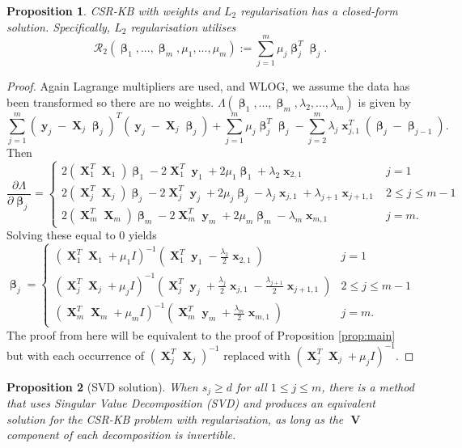 \documentclass[12pt]{article}
\DeclareMathOperator{\bx}{\mathbf{x}}
\DeclareMathOperator{\bX}{\mathbf{X}}
\DeclareMathOperator{\by}{\mathbf{y}}
\DeclareMathOperator{\bV}{\mathbf{V}}
\DeclareMathOperator{\bbeta}{\boldsymbol{\beta}}
\newtheorem{prop}{Proposition}
\begin{document}
\begin{prop}
CSR-KB with weights and $L_2$ regularisation has a closed-form solution. Specifically, $L_2$ regularisation utilises 
$$\mathcal{R}_2(\bbeta_1, ..., \bbeta_m, \mu_1, ..., \mu_m) := \sum_{j=1}^m \mu_j \bbeta_j^T\bbeta_j.$$
\end{prop}
\begin{proof}
Again Lagrange multipliers are used, and WLOG, we assume the data has been transformed so there are no weights. $\Lambda(\bbeta_1,...,\bbeta_m,\lambda_2,...,\lambda_m)$ is given by
$$\sum_{j=1}^m (\by_j-\bX_j\bbeta_j)^T(\by_j-\bX_j\bbeta_j)+\sum_{j=1}^m \mu_j \bbeta_j^T\bbeta_j-\sum_{j=2}^m\lambda_j\bx_{j, 1}^T (\bbeta_j - \bbeta_{j-1}).$$
Then
$$\frac{\partial \Lambda}{\partial \bbeta_j} = \begin{cases}
2(\bX_1^T  \bX_1)\bbeta_1 - 2\bX_1^T \by_1 + 2\mu_1\bbeta_1 +\lambda_{2}\bx_{2, 1} & j=1 \\
2(\bX_j^T  \bX_j)\bbeta_j - 2\bX_j^T  \by_j + 2\mu_j\bbeta_j - \lambda_j\bx_{j, 1}+\lambda_{j+1}\bx_{j+1, 1} & 2 \leq j \leq m-1 \\
2(\bX_m^T \bX_m)\bbeta_m - 2\bX_m^T \by_m + 2\mu_m\bbeta_m  - \lambda_m\bx_{m, 1} & j=m.
\end{cases}$$
Solving these equal to $0$ yields
$$\bbeta_j=\begin{cases}
\left(\bX_1^T  \bX_1+\mu_1I\right)^{-1}(\bX_1^T \by_1 -\frac{\lambda_{2}}{2}\bx_{2, 1}) & j=1 \\
\left(\bX_j^T  \bX_j+\mu_jI \right)^{-1}(\bX_j^T \by_j + \frac{\lambda_j}{2}\bx_{j, 1}-\frac{\lambda_{j+1}}{2}\bx_{j+1, 1}) & 2 \leq j \leq m-1 \\
\left(\bX_m^T \bX_m+\mu_mI\right)^{-1}(\bX_m^T \by_m + \frac{\lambda_m}{2}\bx_{m, 1}) & j=m.
\end{cases}$$
The proof from here will be equivalent to the proof of Proposition \ref{prop:main} but with each occurrence of $\left(\bX_j^T  \bX_j \right)^{-1}$ replaced with $\left(\bX_j^T \bX_j+\mu_jI \right)^{-1}$.
\end{proof}
\begin{prop}[SVD solution]
When $s_j \geq d$ for all $1 \leq j \leq m$, there is a method that uses Singular Value Decomposition (SVD) and produces an equivalent solution for the CSR-KB problem with regularisation, as long as the $\bV$ component of each decomposition is invertible.
\end{prop}
\end{document}
